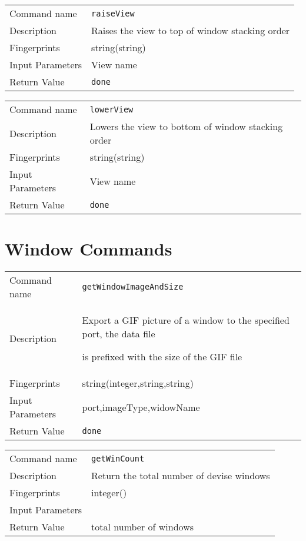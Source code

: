 \noindent
\begin{tabular}{l|p{5in}}
\hline
Command name &{\tt raiseView }\\ 
Description &
 Raises the view to top of window stacking order 
 	\\
Fingerprints & string(string)\\
Input Parameters& View name \\
Return Value&{\tt done}\\
\hline
\end{tabular}
\bigskip

\noindent
\begin{tabular}{l|p{5in}}
\hline
Command name &{\tt lowerView }\\ 
Description &
 Lowers the view to bottom of window stacking order 
 	\\
Fingerprints & string(string)\\
Input Parameters& View name \\
Return Value&{\tt done}\\
\hline
\end{tabular}
\bigskip


\section{Window Commands}
\noindent
\begin{tabular}{l|p{5in}}
\hline
Command name &{\tt getWindowImageAndSize }\\ 
Description &
Export a GIF picture of a window to the specified port, the data file
 
is prefixed with the size of the GIF file
 	\\
Fingerprints & string(integer,string,string)\\
Input Parameters&port,imageType,widowName\\
Return Value&{\tt done}\\
\hline
\end{tabular}
\bigskip

\noindent
\begin{tabular}{l|p{5in}}
\hline
Command name &{\tt getWinCount }\\ 
Description &
Return the total number of devise windows
 	\\
Fingerprints & integer()\\
Input Parameters&\\
Return Value&total number of windows\\
\hline
\end{tabular}
\bigskip

